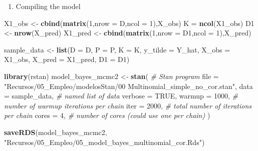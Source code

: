 \documentclass[
  12pt,
]{book}
\newenvironment{Shaded}{\begin{snugshade}}{\end{snugshade}}
\newcommand{\AttributeTok}[1]{\textcolor[rgb]{0.13,0.29,0.53}{#1}}
\newcommand{\CommentTok}[1]{\textcolor[rgb]{0.56,0.35,0.01}{\textit{#1}}}
\newcommand{\ConstantTok}[1]{\textcolor[rgb]{0.56,0.35,0.01}{#1}}
\newcommand{\DecValTok}[1]{\textcolor[rgb]{0.00,0.00,0.81}{#1}}
\newcommand{\FunctionTok}[1]{\textcolor[rgb]{0.13,0.29,0.53}{\textbf{#1}}}
\newcommand{\NormalTok}[1]{#1}
\newcommand{\OtherTok}[1]{\textcolor[rgb]{0.56,0.35,0.01}{#1}}
\newcommand{\StringTok}[1]{\textcolor[rgb]{0.31,0.60,0.02}{#1}}
\providecommand{\tightlist}{%
  \setlength{\itemsep}{0pt}\setlength{\parskip}{0pt}}
\begin{document}
\begin{enumerate}
\def\labelenumi{\arabic{enumi}.}
\setcounter{enumi}{3}
\tightlist
\item
  Compiling the model
\end{enumerate}

\begin{Shaded}
\begin{Highlighting}[]
\NormalTok{X1\_obs }\OtherTok{\textless{}{-}} \FunctionTok{cbind}\NormalTok{(}\FunctionTok{matrix}\NormalTok{(}\DecValTok{1}\NormalTok{,}\AttributeTok{nrow =}\NormalTok{ D,}\AttributeTok{ncol =} \DecValTok{1}\NormalTok{),X\_obs)}
\NormalTok{K }\OtherTok{=} \FunctionTok{ncol}\NormalTok{(X1\_obs)}
\NormalTok{D1 }\OtherTok{\textless{}{-}} \FunctionTok{nrow}\NormalTok{(X\_pred)}
\NormalTok{X1\_pred }\OtherTok{\textless{}{-}} \FunctionTok{cbind}\NormalTok{(}\FunctionTok{matrix}\NormalTok{(}\DecValTok{1}\NormalTok{,}\AttributeTok{nrow =}\NormalTok{ D1,}\AttributeTok{ncol =} \DecValTok{1}\NormalTok{),X\_pred)}

\NormalTok{sample\_data }\OtherTok{\textless{}{-}} \FunctionTok{list}\NormalTok{(}\AttributeTok{D =}\NormalTok{ D,}
                    \AttributeTok{P =}\NormalTok{ P,}
                    \AttributeTok{K =}\NormalTok{ K,}
                    \AttributeTok{y\_tilde =}\NormalTok{ Y\_hat,}
                    \AttributeTok{X\_obs =}\NormalTok{ X1\_obs,}
                    \AttributeTok{X\_pred =}\NormalTok{ X1\_pred,}
                    \AttributeTok{D1 =}\NormalTok{ D1)}


\FunctionTok{library}\NormalTok{(rstan)}
\NormalTok{model\_bayes\_mcmc2 }\OtherTok{\textless{}{-}} \FunctionTok{stan}\NormalTok{(}
   \CommentTok{\# Stan program}
  \AttributeTok{file =} \StringTok{"Recursos/05\_Empleo/modelosStan/00 Multinomial\_simple\_no\_cor.stan"}\NormalTok{, }
  \AttributeTok{data =}\NormalTok{ sample\_data,    }\CommentTok{\# named list of data}
  \AttributeTok{verbose =} \ConstantTok{TRUE}\NormalTok{,}
  \AttributeTok{warmup =} \DecValTok{1000}\NormalTok{,          }\CommentTok{\# number of warmup iterations per chain}
  \AttributeTok{iter =} \DecValTok{2000}\NormalTok{,            }\CommentTok{\# total number of iterations per chain}
  \AttributeTok{cores =} \DecValTok{4}\NormalTok{,              }\CommentTok{\# number of cores (could use one per chain)}
\NormalTok{)}

\FunctionTok{saveRDS}\NormalTok{(model\_bayes\_mcmc2,}
        \StringTok{"Recursos/05\_Empleo/05\_model\_bayes\_multinomial\_cor.Rds"}\NormalTok{)}
\end{Highlighting}
\end{Shaded}
\end{document}
